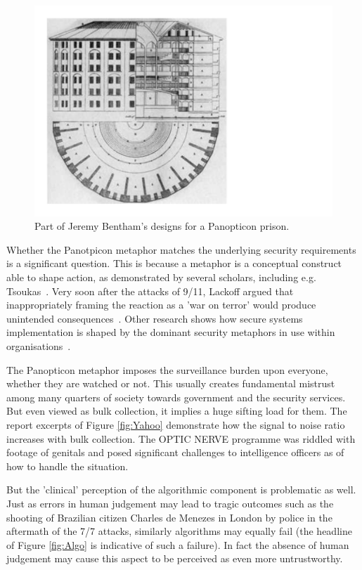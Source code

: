 \documentclass{llncs}
\begin{document}
\begin{figure}
\begin{center}
\includegraphics[scale=0.3]{fig2}
\caption{Part of Jeremy Bentham's designs for a Panopticon prison.}
\label{fig:Panopticon}
\end{center}
\end{figure}

Whether the Panotpicon metaphor matches the underlying security requirements is a significant question. This is because a metaphor is a conceptual construct able to shape action, as demonstrated by several scholars, including e.g. Tsoukas~\cite{Tsoukas}. Very soon after the attacks of 9/11, Lackoff argued that inappropriately framing the reaction as a 'war on terror' would produce unintended consequences~\cite{Lackoff}. Other research shows how secure systems implementation is shaped by the dominant security metaphors in use within organisations~\cite{Tryfonas}.

The Panopticon metaphor imposes the surveillance burden upon everyone, whether they are watched or not. This usually creates fundamental mistrust among many quarters of society towards government and the security services. But even viewed as bulk collection, it implies a huge sifting load for them. The report excerpts of Figure \ref{fig:Yahoo} demonstrate how the signal to noise ratio increases with bulk collection. The OPTIC NERVE programme was riddled with footage of genitals and posed significant challenges to intelligence officers as of how to handle the situation.

But the 'clinical' perception of the algorithmic component is problematic as well. Just as errors in human judgement may lead to tragic outcomes such as the shooting of Brazilian citizen Charles de Menezes in London by police in the aftermath of the 7/7 attacks, similarly algorithms may equally fail (the headline of Figure \ref{fig:Algo} is indicative of such a failure). In fact the absence of human judgement may cause this aspect to be perceived as even more untrustworthy. 
\end{document}
